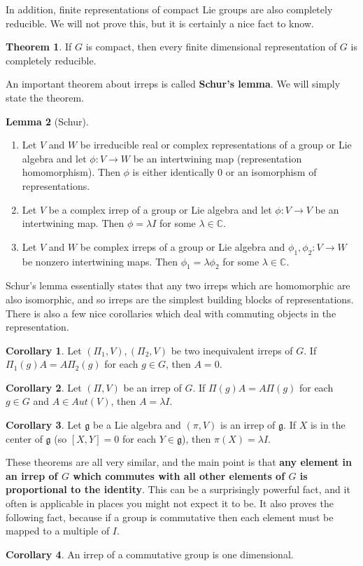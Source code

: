 \documentclass[11pt, oneside]{article}   	%
\theoremstyle{definition}
\newtheorem{theorem}{Theorem}[section]
\newtheorem{corollary}{Corollary}[theorem]
\newtheorem{lemma}[theorem]{Lemma}
\begin{document}
In addition, finite representations of compact Lie groups are also completely reducible. We will not prove this, but it 
is certainly a nice fact to know.

\begin{theorem}
	If $G$ is compact, then every finite dimensional representation of $G$ is completely reducible.
\end{theorem}

An important theorem about irreps is called \textbf{Schur's lemma}. We will simply state the theorem.
\begin{lemma}[Schur]
	\begin{enumerate}
		\item Let $V$ and $W$ be irreducible real or complex representations of a group or Lie algebra and 
		let $\phi : V\rightarrow W$ be an intertwining map (representation homomorphism). Then $\phi$ 
		is either identically 0 or an isomorphism of representations.
		\item Let $V$ be a complex irrep of a group or Lie algebra and let $\phi : V\rightarrow V$ be an 
		intertwining map. Then $\phi = \lambda I$ for some $\lambda\in\mathbb C$. 
		\item Let $V$ and $W$ be complex irreps of a group or Lie algebra and $\phi_1, \phi_2 : V\rightarrow 
		W$ be nonzero intertwining maps. Then $\phi_1 = \lambda\phi_2$ for some $\lambda\in\mathbb C$. 
	\end{enumerate}
\end{lemma}
Schur's lemma essentially states that any two irreps which are homomorphic are also isomorphic, and so irreps 
are the simplest building blocks of representations. There is also a few nice corollaries which deal with commuting 
objects in the representation.
\begin{corollary}
	Let $(\Pi_1, V), (\Pi_2, V)$ be two inequivalent irreps of $G$. If $\Pi_1(g) A = A\Pi_2(g)$ for each $g\in G$, then 
	$A = 0$. 
\end{corollary}
\begin{corollary}
	Let $(\Pi, V)$ be an irrep of $G$. If $\Pi(g)A = A\Pi(g)$ for each $g\in G$ and $A\in Aut(V)$, then $A = \lambda I$. 
\end{corollary}
\begin{corollary}
	Let $\mathfrak g$ be a Lie algebra and $(\pi, V)$ is an irrep of $\mathfrak g$. If $X$ is in the center of 
	$\mathfrak g$ (so $[X, Y] = 0$ for each $Y\in\mathfrak g$), then $\pi(X) = \lambda I$. 
\end{corollary}
These theorems are all very similar, and the main point is that \textbf{any element in an irrep of $G$ which commutes 
with all other elements of $G$ is proportional to the identity}. This can be a surprisingly powerful fact, and it often 
is applicable in places you might not expect it to be. It also proves the following fact, because if a group is 
commutative then each element must be mapped to a multiple of $I$. 
\begin{corollary}
	An irrep of a commutative group is one dimensional.
\end{corollary}
\end{document}
